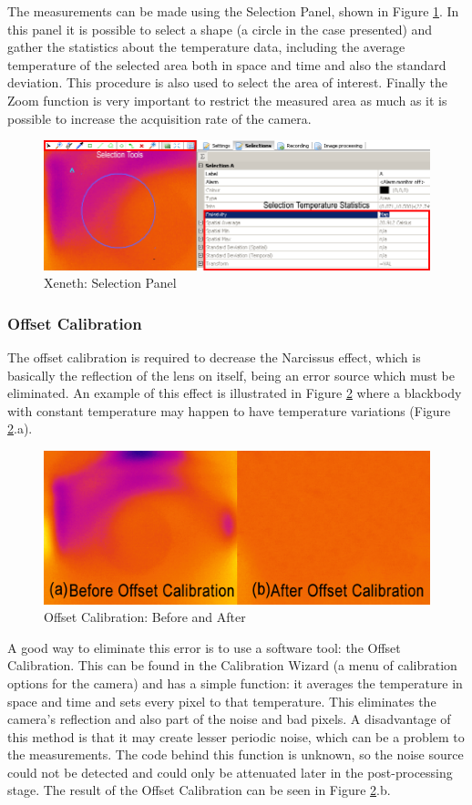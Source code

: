 \par The measurements can be made using the Selection Panel, shown in Figure \ref{fig:xeneth3}. In this panel it is possible to select a shape (a circle in the case presented) and gather the statistics about the temperature data, including the average temperature of the selected area both in space and time and also the standard deviation. This procedure is also used to select the area of interest. Finally the Zoom function is very important to restrict the measured area as much as it is possible to increase the acquisition rate of the camera. \\
\begin{figure}[h]
\centering
\includegraphics[width=0.7\linewidth]{Figures/3.Chapter/xeneth3.png}
\caption{Xeneth: Selection Panel}
\label{fig:xeneth3}
\end{figure}
\subsubsection{Offset Calibration}
\par The offset calibration is required to decrease the Narcissus effect, which is basically the reflection of the lens on itself, being an error source which must be eliminated. An example of this effect is illustrated in Figure \ref{fig:xeneth5} where a blackbody with constant temperature may happen to have temperature variations (Figure \ref{fig:xeneth5}.a).

\begin{figure}[h]
\centering
\includegraphics[width=0.7\linewidth]{Figures/3.Chapter/xeneth5.png}
\caption{Offset Calibration: Before and After}
\label{fig:xeneth5}
\end{figure}
\par A good way to eliminate this error is to use a software tool: the Offset Calibration. This can be found in the Calibration Wizard (a menu of calibration options for the camera) and has a simple function: it averages the temperature in space and time and sets every pixel to that temperature. This eliminates the camera's reflection and also part of the noise and bad pixels. A disadvantage of this method is that it may create lesser periodic noise, which can be a problem to the measurements. The code behind this function is unknown, so the noise source could not be detected and could only be attenuated later in the post-processing stage. The result of the Offset Calibration can be seen in Figure \ref{fig:xeneth5}.b. \\